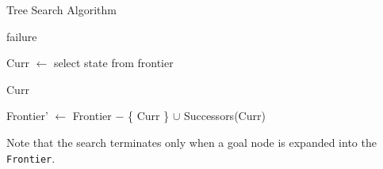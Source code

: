 \newpage
\begin{algorithm}
    \caption{Tree Search Algorithm}
    
    \begin{algorithmic}[1]
                \State \Return failure
            \EndIf

            \State Curr $\gets$ select state from frontier

                \State \Return Curr
            \EndIf

            \State Frontier' $\gets$ Frontier $-$ \{ Curr \} $\cup$ Successors(Curr)

            \State \Return {}
        \EndFunction
    \end{algorithmic}
\end{algorithm}


Note that the search terminates only when a goal node is expanded into the \texttt{Frontier}.